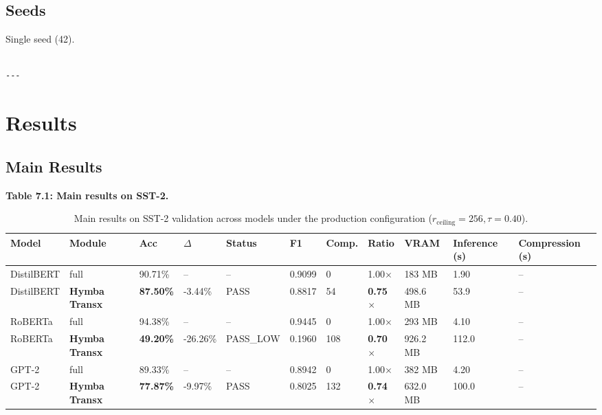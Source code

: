 \subsection{Seeds}

Single seed (42).
\begin{lstlisting}

---
\end{lstlisting}

\section{Results}

\subsection{Main Results}

\textbf{Table 7.1: Main results on SST-2.}

\begin{table}[t]
\centering
\small
\begin{tabular}{lllllllllll}
\toprule
\textbf{Model} & \textbf{Module} & \textbf{Acc} & \textbf{$\Delta$} & \textbf{Status} & \textbf{F1} & \textbf{Comp.} & \textbf{Ratio} & \textbf{VRAM} & \textbf{Inference (s)} & \textbf{Compression (s)} \\
\midrule
DistilBERT & full & 90.71\% & -- & -- & 0.9099 & 0 & 1.00$\times$ & 183 MB & 1.90 & -- \\
DistilBERT & \textbf{Hymba Transx} & \textbf{87.50\%} & -3.44\% & PASS & 0.8817 & 54 & \textbf{0.75$\times$} & 498.6 MB & 53.9 & -- \\
RoBERTa & full & 94.38\% & -- & -- & 0.9445 & 0 & 1.00$\times$ & 293 MB & 4.10 & -- \\
RoBERTa & \textbf{Hymba Transx} & \textbf{49.20\%} & -26.26\% & PASS\_LOW & 0.1960 & 108 & \textbf{0.70$\times$} & 926.2 MB & 112.0 & -- \\
GPT-2 & full & 89.33\% & -- & -- & 0.8942 & 0 & 1.00$\times$ & 382 MB & 4.20 & -- \\
GPT-2 & \textbf{Hymba Transx} & \textbf{77.87\%} & -9.97\% & PASS & 0.8025 & 132 & \textbf{0.74$\times$} & 632.0 MB & 100.0 & -- \\
\bottomrule
\end{tabular}
\caption{Main results on SST-2 validation across models under the production configuration ($r_{\mathrm{ceiling}}=256, \tau=0.40$).}
\label{tab:main_sst2}
\end{table}

